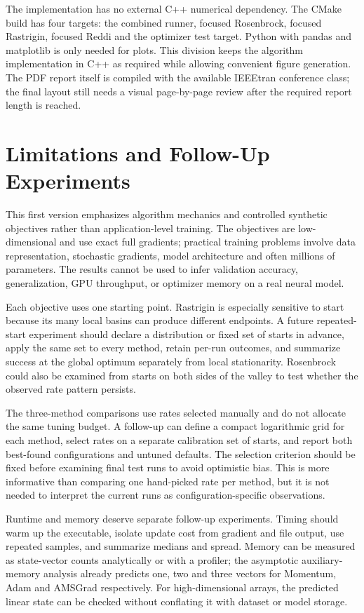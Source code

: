 \documentclass[conference]{IEEEtran}
\begin{document}
The implementation has no external C++ numerical dependency. The CMake build has four targets: the combined runner, focused Rosenbrock, focused Rastrigin, focused Reddi and the optimizer test target. Python with pandas and matplotlib is only needed for plots. This division keeps the algorithm implementation in C++ as required while allowing convenient figure generation. The PDF report itself is compiled with the available IEEEtran conference class; the final layout still needs a visual page-by-page review after the required report length is reached.
\section{Limitations and Follow-Up Experiments}
This first version emphasizes algorithm mechanics and controlled synthetic objectives rather than application-level training. The objectives are low-dimensional and use exact full gradients; practical training problems involve data representation, stochastic gradients, model architecture and often millions of parameters. The results cannot be used to infer validation accuracy, generalization, GPU throughput, or optimizer memory on a real neural model.

Each objective uses one starting point. Rastrigin is especially sensitive to start because its many local basins can produce different endpoints. A future repeated-start experiment should declare a distribution or fixed set of starts in advance, apply the same set to every method, retain per-run outcomes, and summarize success at the global optimum separately from local stationarity. Rosenbrock could also be examined from starts on both sides of the valley to test whether the observed rate pattern persists.

The three-method comparisons use rates selected manually and do not allocate the same tuning budget. A follow-up can define a compact logarithmic grid for each method, select rates on a separate calibration set of starts, and report both best-found configurations and untuned defaults. The selection criterion should be fixed before examining final test runs to avoid optimistic bias. This is more informative than comparing one hand-picked rate per method, but it is not needed to interpret the current runs as configuration-specific observations.

Runtime and memory deserve separate follow-up experiments. Timing should warm up the executable, isolate update cost from gradient and file output, use repeated samples, and summarize medians and spread. Memory can be measured as state-vector counts analytically or with a profiler; the asymptotic auxiliary-memory analysis already predicts one, two and three vectors for Momentum, Adam and AMSGrad respectively. For high-dimensional arrays, the predicted linear state can be checked without conflating it with dataset or model storage.
\end{document}
